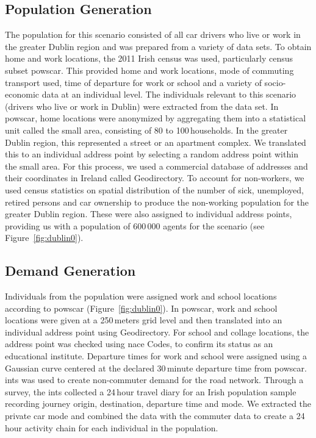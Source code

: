 \subsection{Population Generation}
The population for this scenario consisted of all car drivers who live or work in the greater Dublin region and was prepared from a variety of data sets. To obtain home and work locations, the 2011 Irish census was used, particularly census subset \gls{powscar}. This provided home and work locations, mode of commuting transport used, time of departure for work or school and a variety of socio-economic data at an individual level. The individuals relevant to this scenario (drivers who live or work in Dublin) were extracted from the data set. In \gls{powscar}, home locations were anonymized by aggregating them into a statistical unit called the small area, consisting of 80 to 100\,households.  In the greater Dublin region, this represented a street or an apartment complex. We translated this to an individual address point by selecting a random address point within the small area. For this process, we used a commercial database of addresses and their coordinates in Ireland called Geodirectory. To account for non-workers, we used census statistics on spatial distribution of the number of sick, unemployed, retired persons and car ownership to produce the non-working population for the greater Dublin region.  These were also assigned to individual address points, providing us with a population of 600\,000 agents for the scenario (see Figure~\ref{fig:dublin0}).

\subsection{Demand Generation}
Individuals from the population were assigned work and school locations according to \gls{powscar} (Figure~\ref{fig:dublin0}). In \gls{powscar}, work and school locations were given at a 250\,meters grid level and then translated into an individual address point using Geodirectory. For school and collage locations, the address point was checked using \gls{nace} Codes, to confirm its status as an educational institute. Departure times for work  and school were assigned using a Gaussian curve centered at the declared 30\,minute departure time from \gls{powscar}.  \gls{ints} was used to create non-commuter demand for the road network. Through a survey, the \gls{ints} collected a 24\,hour travel diary for an Irish population sample recording journey origin, destination, departure time and mode. We extracted the private car mode and combined the data with the commuter data to create a 24\,hour activity chain for each individual in the population.

